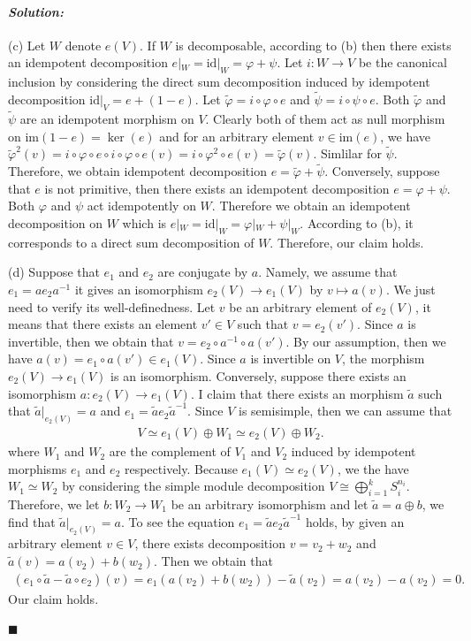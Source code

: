 \documentclass[12pt, a4paper]{article}
\theoremstyle{remark}
\newenvironment{solution}
  {\paragraph{\textit{Solution:}}\par\medskip}
  {\hfill$\blacksquare$\vspace{0.1cm}}
\begin{document}
\begin{solution}
    (c) Let $W$ denote $e(V)$.
     If $W$ is decomposable, according to (b) then there exists an idempotent decomposition $e|_{W}=\text{id}|_{W}=\varphi+\psi $. 
     Let $i:W\to V$ be the canonical inclusion by considering the direct sum decomposition induced by idempotent decomposition $\text{id}|_V = e+(1-e)$. Let $\tilde{\varphi}=i\circ \varphi \circ e$ and $\tilde{\psi}=i\circ \psi \circ e$.
     Both $\tilde{\varphi}$ and $\tilde{\psi}$ are an idempotent morphism on $V$. Clearly both of them act as null morphism on $\text{im}(1-e)=\ker(e)$ and for an arbitrary element $v\in\text{im}(e)$,
    we have $\tilde{\varphi}^2(v)=i\circ \varphi\circ e \circ i \circ \varphi\circ e(v)= i\circ \varphi^2\circ e(v)=\tilde{\varphi}(v)$. Simlilar for $\tilde{\psi}$.
    Therefore, we obtain idempotent decomposition $e = \tilde{\varphi}+\tilde{\psi}$.
    Conversely, suppose that $e$ is not primitive, then there exists an idempotent decomposition $e=\varphi+\psi$. Both $\varphi$ and $\psi$ act idempotently on $W$. Therefore we obtain an idempotent decomposition on $W$ which is $e|_W =\text{id}|_W = \varphi|_W+\psi|_W $.
    According to (b), it corresponds to a direct sum decomposition of $W$. Therefore, our claim holds.

    (d) Suppose that $e_1$ and $e_2$ are conjugate by $a$. Namely, we assume that $e_1=ae_2a^{-1}$ it gives an isomorphism $e_2(V)\to e_1(V)$ by $v\mapsto a(v)$.
    We just need to verify its well-definedness. Let $v$ be an arbitrary element of $e_2(V)$, it means that there exists an element $v'\in V$ such that $v=e_2(v')$.
    Since $a$ is invertible, then we obtain that $v=e_2\circ a^{-1}\circ a(v')$. By our assumption, then we have $a(v) = e_1\circ a(v')\in e_1(V)$. Since $a$ is invertible on $V$,
    the morphism $e_2(V)\to e_1(V)$ is an isomorphism.
    Conversely, suppose there exists an isomorphism $a:e_2(V)\to e_1(V)$. I claim that there exists an morphism $\tilde{a}$ such that $\tilde{a}|_{e_2(V)}= a$ and $e_1=\tilde{a} e_2 \tilde{a}^{-1}$.
    Since $V$ is semisimple, then we can assume that 
    \begin{align*}
         V\simeq e_1(V)\oplus W_1 \simeq e_2(V)\oplus W_2.
    \end{align*}
    where $W_1$ and $W_2$ are the complement of $V_1$ and $V_2$ induced by idempotent morphisms $e_1$ and $e_2$ respectively.
    Because $e_1(V)\simeq e_2(V)$, we the have $W_1\simeq W_2$ by considering the simple module decomposition $V \cong \bigoplus_{i=1}^k S_i^{n_i}$.
    Therefore, we let $b:W_2\to W_1$ be an arbitrary isomorphism and let $\tilde{a}=a\oplus b$, we find that $\tilde{a}|_{e_2(V)}=a$.
    To see the equation $e_1=\tilde{a} e_2 \tilde{a}^{-1}$ holds, by given an arbitrary element $v\in V$, there exists decomposition $v=v_2+w_2$ and $\tilde{a}(v)=a(v_2)+b(w_2)$.
    Then we obtain that 
    \begin{align*}
        (e_1\circ \tilde{a}-  \tilde{a}\circ e_2) (v) = e_1(a(v_2)+b(w_2))-\tilde{a}(v_2) = a(v_2)-a(v_2)=0.
    \end{align*}
    Our claim holds.


\end{solution}
\end{document}

